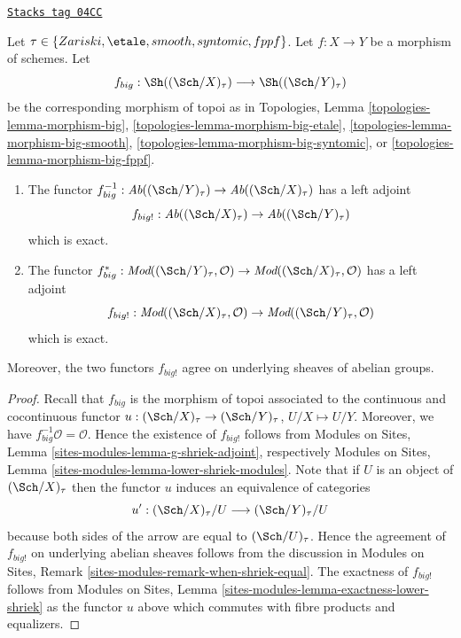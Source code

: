 \begin{lemma}
\label{etale-cohomology-lemma-exactness-lower-shriek}
\href{https://stacks.math.columbia.edu/tag/04CC}{\texttt{Stacks tag 04CC}}

Let $\tau \in \{Zariski, \etale, smooth, syntomic, fppf\}$.
Let $f : X \to Y$ be a morphism of schemes. Let
$$
f_{big} :
\Sh((\Sch/X)_\tau)
\longrightarrow
\Sh((\Sch/Y)_\tau)
$$
be the corresponding morphism of topoi as in
Topologies, Lemma
\ref{topologies-lemma-morphism-big},
\ref{topologies-lemma-morphism-big-etale},
\ref{topologies-lemma-morphism-big-smooth},
\ref{topologies-lemma-morphism-big-syntomic}, or
\ref{topologies-lemma-morphism-big-fppf}.
\begin{enumerate}
\item The functor
$f_{big}^{-1} : \textit{Ab}((\Sch/Y)_\tau) \to \textit{Ab}((\Sch/X)_\tau)$
has a left adjoint
$$
f_{big!} : \textit{Ab}((\Sch/X)_\tau) \to \textit{Ab}((\Sch/Y)_\tau)
$$
which is exact.
\item The functor
$f_{big}^* :
\textit{Mod}((\Sch/Y)_\tau, \mathcal{O})
\to
\textit{Mod}((\Sch/X)_\tau, \mathcal{O})$
has a left adjoint
$$
f_{big!} :
\textit{Mod}((\Sch/X)_\tau, \mathcal{O})
\to
\textit{Mod}((\Sch/Y)_\tau, \mathcal{O})
$$
which is exact.
\end{enumerate}
Moreover, the two functors $f_{big!}$ agree on underlying sheaves
of abelian groups.
\end{lemma}

\begin{proof}
Recall that $f_{big}$ is the morphism of topoi associated to the
continuous and cocontinuous functor
$u : (\Sch/X)_\tau \to (\Sch/Y)_\tau$, $U/X \mapsto U/Y$.
Moreover, we have $f_{big}^{-1}\mathcal{O} = \mathcal{O}$.
Hence the existence of $f_{big!}$ follows from
Modules on Sites, Lemma \ref{sites-modules-lemma-g-shriek-adjoint},
respectively
Modules on Sites, Lemma \ref{sites-modules-lemma-lower-shriek-modules}.
Note that if $U$ is an object of $(\Sch/X)_\tau$ then the functor
$u$ induces an equivalence of categories
$$
u' :
(\Sch/X)_\tau/U
\longrightarrow
(\Sch/Y)_\tau/U
$$
because both sides of the arrow are equal to $(\Sch/U)_\tau$.
Hence the agreement of $f_{big!}$ on underlying abelian sheaves
follows from the discussion in
Modules on Sites, Remark \ref{sites-modules-remark-when-shriek-equal}.
The exactness of $f_{big!}$ follows from
Modules on Sites, Lemma \ref{sites-modules-lemma-exactness-lower-shriek}
as the functor $u$ above which commutes with fibre products and equalizers.
\end{proof}

